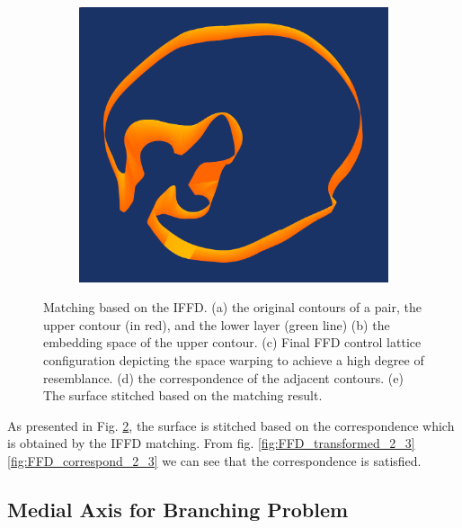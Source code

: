 \documentclass[3p,times]{elsarticle}
\begin{document}
\begin{figure}[ht]
\begin{subfigure}[b]{0.25\textwidth}
\end{subfigure}
~~~~~~~~~~~~~~~~~~~~~
\begin{subfigure}[b]{0.25\textwidth}
\includegraphics[width=\textwidth,height=0.15\textheight]{../picture/FFD_surface_2_3.png}
\caption{}
\label{fig:FFD_surface_2_3}
\end{subfigure}
\caption{Matching based on the IFFD. 
  (a) the original contours of a pair, the upper contour (in red), and the lower layer (green line)
  (b) the embedding space of the upper contour.
  (c) Final FFD control lattice configuration depicting the space
  warping to achieve a high degree of resemblance.
  (d) the correspondence of the adjacent contours.
  (e) The surface stitched based on the matching result.}
\label{fig:FFD_Result}
\end{figure}


As presented in Fig. \ref{fig:FFD_Result}, the surface is stitched
based on the correspondence which is obtained by the IFFD
matching. From fig. \ref{fig:FFD_transformed_2_3} \ref{fig:FFD_correspond_2_3} we
can see that the correspondence is satisfied.

\subsection{Medial Axis for Branching Problem}
\label{medial axis}
\end{document}
